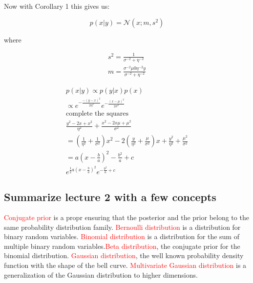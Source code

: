 Now with Corollary 1 this gives us:

\begin{equation}
    p(x|y) = \mathcal{N}(x;m,s^{2})
\end{equation}

where

\begin{equation}
\begin{aligned}
    s^{2} = \frac{1} {\sigma^{-2} + \eta^{-2}} \\
    m = \frac{\sigma^{-2}\mu 0 \eta^{-2}y} {\sigma^{-2} + \eta^{-2}}  
\end{aligned}
\end{equation}

\begin{wbox}{}
    \begin{equation}
        \begin{aligned}
            p(x|y) \propto p(y|x)p(x) \\
            \propto  e^{-\frac{-(y-x)^{2}} {2\eta^{2}} } e^{- \frac{(x-\mu)^{2}} {2 \sigma^{2}} } \\
            \text{complete the squares} \\
            \frac{y^{2} - 2x + x^{2}} {\eta^{2} } + \frac{x^{2}-2x\mu + \mu^{2}} {\sigma^{2}} \\
            = (\frac{1} {\eta^{2}} + \frac{1} {\sigma^{2}} ) x^{2} - 2(\frac{y} {\eta^{2}} + \frac{\mu} {\sigma^{2}} )x + \frac{y^{2}} {\eta^{2}} + \frac{\mu^{2}} {\sigma^{2}} \\
            = a (x- \frac{b} {a} )^{2} - \frac{b^{2}} {a} + c \\
            e^{\frac{1} {2}a(x - \frac{b} {a} )^{2} } e^{-\frac{b^{2}} {a} +c }
        \end{aligned}
        \end{equation}
\end{wbox}


\subsection*{Summarize lecture 2 with a few concepts}
\textcolor{red}{Conjugate prior} is a propr ensuring that the posterior and the prior belong to the same probability distribution family. \textcolor{red}{Bernoulli distribution} is a distribution for binary random variables. 
\textcolor{red}{Binomial distribution} is a distribution for the sum of multiple binary random variables.\textcolor{red}{Beta distribution}, the conjugate prior for the binomial distribution. \textcolor{red}{Gaussian distribution}, the well
known probability density function with the shape of the bell curve. \textcolor{red}{Multivariate Gaussian distribution} is a generalization of the Gaussian distribution to higher dimensions.

